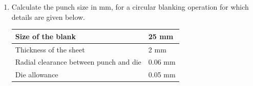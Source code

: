 \documentclass[journal,11pt,onecolumn]{IEEEtran}
\begin{document}
\begin{enumerate}[resume]
          \begin{enumerate}
          \end{enumerate}

    \item Calculate the punch size in mm, for a circular blanking operation for which details are given below.

          \begin{table}[H]
              \centering
              \begin{tabular}{|l|l|}
                  \hline
                  Size of the blank                      & 25 mm   \\
                  \hline
                  Thickness of the sheet                 & 2 mm    \\
                  \hline
                  Radial clearance between punch and die & 0.06 mm \\
                  \hline
                  Die allowance                          & 0.05 mm \\
                  \hline
              \end{tabular}
          \end{table}

          \begin{enumerate}
          \end{enumerate}


\end{enumerate}
\end{document}
